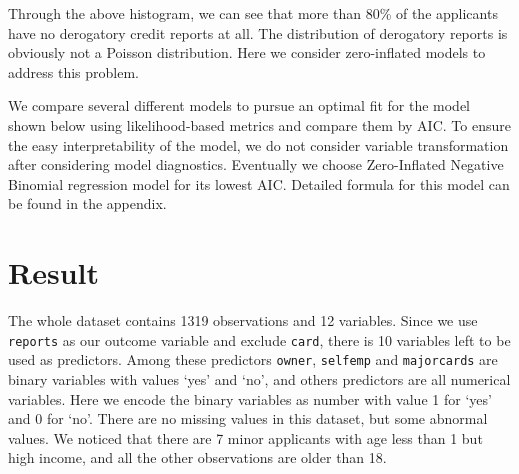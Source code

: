\documentclass[
]{article}
\begin{document}
Through the above histogram, we can see that more than 80\% of the
applicants have no derogatory credit reports at all. The distribution of
derogatory reports is obviously not a Poisson distribution. Here we
consider zero-inflated models to address this problem.

We compare several different models to pursue an optimal fit for the
model shown below using likelihood-based metrics and compare them by
AIC. To ensure the easy interpretability of the model, we do not
consider variable transformation after considering model diagnostics.
Eventually we choose Zero-Inflated Negative Binomial regression model
for its lowest AIC. Detailed formula for this model can be found in the
appendix.

\hypertarget{result}{%
\section{Result}\label{result}}

The whole dataset contains 1319 observations and 12 variables. Since we
use \texttt{reports} as our outcome variable and exclude \texttt{card},
there is 10 variables left to be used as predictors. Among these
predictors \texttt{owner}, \texttt{selfemp} and \texttt{majorcards} are
binary variables with values `yes' and `no', and others predictors are
all numerical variables. Here we encode the binary variables as number
with value 1 for `yes' and 0 for `no'. There are no missing values in
this dataset, but some abnormal values. We noticed that there are 7
minor applicants with age less than 1 but high income, and all the other
observations are older than 18.
\end{document}
